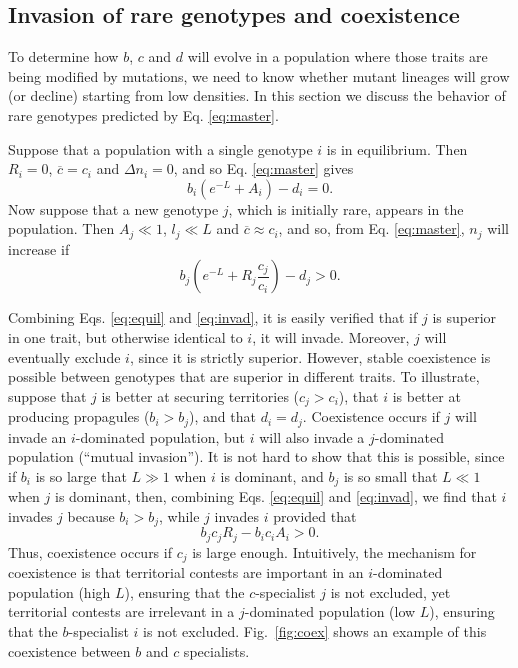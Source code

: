 \documentclass[11pt]{article}
\begin{document}
\subsection*{Invasion of rare genotypes and coexistence}\label{sec:invas}

To determine how $b$, $c$ and $d$ will evolve in a population where those traits are being modified by mutations, we need to know whether mutant lineages will grow (or decline) starting from low densities. In this section we discuss the behavior of rare genotypes predicted by Eq. \eqref{eq:master}. 

Suppose that a population with a single genotype $i$ is in equilibrium. Then $R_i=0$, $\overline{c}=c_i$ and $\Delta n_i = 0$, and so Eq. \eqref{eq:master} gives
\begin{equation}
b_i\left(e^{-L}+A_i\right)-d_i=0.\label{eq:equil}
\end{equation}
Now suppose that a new genotype $j$, which is initially rare, appears in the population. Then $A_j\ll 1$, $l_j\ll L$ and $\overline{c}\approx c_i$, and so, from Eq. \eqref{eq:master}, $n_j$ will increase if 
\begin{equation}
b_j \left(e^{-L}+R_j\frac{c_j}{c_i}\right)-d_j>0.\label{eq:invad}
\end{equation}

Combining Eqs. \eqref{eq:equil} and \eqref{eq:invad}, it is easily verified that if $j$ is superior in one trait, but otherwise identical to $i$, it will invade. Moreover, $j$ will eventually exclude $i$, since it is strictly superior. However, stable coexistence is possible between genotypes that are superior in different traits. To illustrate, suppose that $j$ is better at securing territories ($c_j>c_i$), that $i$ is better at producing propagules ($b_i>b_j$), and that $d_i=d_j$. Coexistence occurs if $j$ will invade an $i$-dominated population, but $i$ will also invade a $j$-dominated population (``mutual invasion''). It is not hard to show that this is possible, since if $b_i$ is so large that $L\gg 1$ when $i$ is dominant, and $b_j$ is so small that $L\ll 1$ when $j$ is dominant, then, combining Eqs. \eqref{eq:equil} and \eqref{eq:invad}, we find that $i$ invades $j$ because $b_i>b_j$, while $j$ invades $i$ provided that
\begin{equation}
b_jc_jR_j-b_i c_i A_i>0. \label{eq:jinvadcoex}
\end{equation}
Thus, coexistence occurs if $c_j$ is large enough. Intuitively, the mechanism for coexistence is that territorial contests are important in an $i$-dominated population (high $L$), ensuring that the $c$-specialist $j$ is not excluded, yet territorial contests are irrelevant in a $j$-dominated population (low $L$), ensuring that the $b$-specialist $i$ is not excluded. Fig.~\ref{fig:coex} shows an example of this coexistence between $b$ and $c$ specialists. 
\end{document}
